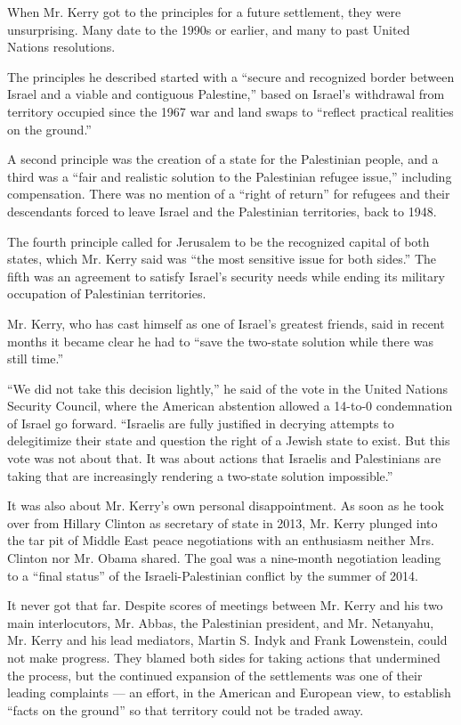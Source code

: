 When Mr. Kerry got to the principles for a future settlement, they were
unsurprising. Many date to the 1990s or earlier, and many to past United
Nations resolutions.

The principles he described started with a ``secure and recognized
border between Israel and a viable and contiguous Palestine,'' based on
Israel's withdrawal from territory occupied since the 1967 war and land
swaps to ``reflect practical realities on the ground.''

A second principle was the creation of a state for the Palestinian
people, and a third was a ``fair and realistic solution to the
Palestinian refugee issue,'' including compensation. There was no
mention of a ``right of return'' for refugees and their descendants
forced to leave Israel and the Palestinian territories, back to 1948.

The fourth principle called for Jerusalem to be the recognized capital
of both states, which Mr. Kerry said was ``the most sensitive issue for
both sides.'' The fifth was an agreement to satisfy Israel's security
needs while ending its military occupation of Palestinian territories.

Mr. Kerry, who has cast himself as one of Israel's greatest friends,
said in recent months it became clear he had to ``save the two-state
solution while there was still time.''

``We did not take this decision lightly,'' he said of the vote in the
United Nations Security Council, where the American abstention allowed a
14-to-0 condemnation of Israel go forward. ``Israelis are fully
justified in decrying attempts to delegitimize their state and question
the right of a Jewish state to exist. But this vote was not about that.
It was about actions that Israelis and Palestinians are taking that are
increasingly rendering a two-state solution impossible.''

It was also about Mr. Kerry's own personal disappointment. As soon as he
took over from Hillary Clinton as secretary of state in 2013, Mr. Kerry
plunged into the tar pit of Middle East peace negotiations with an
enthusiasm neither Mrs. Clinton nor Mr. Obama shared. The goal was a
nine-month negotiation leading to a ``final status'' of the
Israeli-Palestinian conflict by the summer of 2014.

It never got that far. Despite scores of meetings between Mr. Kerry and
his two main interlocutors, Mr. Abbas, the Palestinian president, and
Mr. Netanyahu, Mr. Kerry and his lead mediators, Martin S. Indyk and
Frank Lowenstein, could not make progress. They blamed both sides for
taking actions that undermined the process, but the continued expansion
of the settlements was one of their leading complaints --- an effort, in
the American and European view, to establish ``facts on the ground'' so
that territory could not be traded away.

